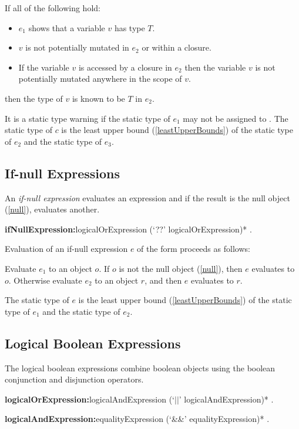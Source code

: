 \documentclass{article}
\begin{document}
\LMHash{}
If all of the following hold:
\begin{itemize}
\item $e_1$ shows that a variable $v$ has type $T$.
\item $v$ is not potentially mutated in $e_2$ or within a closure.
\item If the variable $v$ is accessed by a closure in $e_2$ then the variable $v$ is not potentially mutated anywhere in the scope of $v$.
\end{itemize}

then the type of $v$ is known to be $T$ in $e_2$.

\LMHash{}
It is a static type warning if the static type of $e_1$ may not be assigned to .
The static type of $c$ is the least upper bound (\ref{leastUpperBounds}) of the static type of $e_2$ and the static type of $e_3$.


\subsection{If-null Expressions}
\label{ifNull}

\LMHash{}
An {\em if-null expression} evaluates an expression and if the result is the null object (\ref{null}), evaluates another.

\begin{grammar}
{\bf ifNullExpression:}logicalOrExpression (`??' logicalOrExpression)*
  .
\end{grammar}

\LMHash{}
Evaluation of an if-null expression $e$ of the form 
proceeds as follows:

\LMHash{}
Evaluate $e_1$ to an object $o$.
If $o$ is not the null object (\ref{null}), then $e$ evaluates to $o$.
Otherwise evaluate $e_2$ to an object $r$,
and then $e$ evaluates to $r$.

\LMHash{}
The static type of $e$ is the least upper bound (\ref{leastUpperBounds}) of the static type of $e_1$ and the static type of $e_2$.


\subsection{Logical Boolean Expressions}

\LMHash{}
The logical boolean expressions combine boolean objects using the boolean conjunction and disjunction operators.

\begin{grammar}
{\bf logicalOrExpression:}logicalAndExpression (`$||$' logicalAndExpression)*
  .

{\bf logicalAndExpression:}equalityExpression (`\&\&' equalityExpression)*
  .
\end{grammar}
\end{document}
